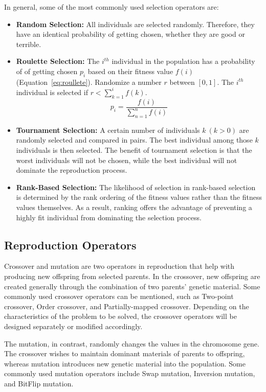 In general, some of the most commonly used selection operators are:
\begin{itemize}
	\item \textbf{Random Selection:} All individuals are selected randomly. Therefore, they have an identical probability of getting chosen, whether they are good or terrible.
	\item \textbf{Roulette Selection:} The $i^{th}$ individual in the population has a probability of of getting chosen $p_i$ based on their fitness value $f(i)$ (Equation~\ref{eq:roullete}). Randomize a number $r$ between $[0,1]$. The $i^{th}$ individual is selected if $r < \sum^i_{k=1} f(k)$.
	\begin{equation}
		\label{eq:roullete}
		p_i = \frac{f(i)}{\sum^n_{n=1} f(i)}
	\end{equation}
	\item \textbf{Tournament Selection:} A certain number of individuals $k~(k > 0)$ are randomly selected and compared in pairs. The best individual among those $k$ individuals is then selected. The benefit of tournament selection is that the worst individuals will not be chosen, while the best individual will not dominate the reproduction process. 
	\item \textbf{Rank-Based Selection:} The likelihood of selection in rank-based selection is determined by the rank ordering of the fitness values rather than the fitness values themselves. As a result, ranking offers the advantage of preventing a highly fit individual from dominating the selection process.
\end{itemize}


\subsection {Reproduction Operators}
\label{ga:reproduction}
Crossover and mutation are two operators in reproduction that help with producing new offspring from selected parents. In the crossover, new offspring are created generally through the combination of two parents' genetic material. Some commonly used crossover operators can be mentioned, such as Two-point crossover, Order crossover, and Partially-mapped crossover. Depending on the characteristics of the problem to be solved, the crossover operators will be designed separately or modified accordingly.

The mutation, in contrast, randomly changes  the values in the chromosome gene. The crossover wishes to maintain dominant materials of parents to offspring, whereas mutation introduces new genetic material into the population. Some commonly used mutation operators include Swap mutation, Inversion mutation, and BitFlip mutation.


